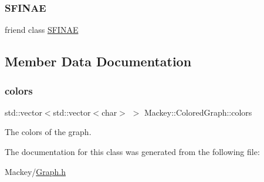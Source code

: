 \subsubsection{\texorpdfstring{S\+F\+I\+N\+AE}{SFINAE}}
{\footnotesize\ttfamily friend class \hyperlink{structMackey_1_1SFINAE}{S\+F\+I\+N\+AE}\hspace{0.3cm}{\ttfamily [friend]}}



\subsection{Member Data Documentation}
\mbox{\label{classMackey_1_1ColoredGraph_a29fbdcaf9f94f0f5d48e5390ba49b338}} 
\subsubsection{\texorpdfstring{colors}{colors}}
{\footnotesize\ttfamily std\+::vector$<$std\+::vector$<$char$>$ $>$ Mackey\+::\+Colored\+Graph\+::colors}



The colors of the graph. 



The documentation for this class was generated from the following file\+:\begin{DoxyCompactItemize}
\item 
Mackey/\hyperlink{Graph_8h}{Graph.\+h}\end{DoxyCompactItemize}
